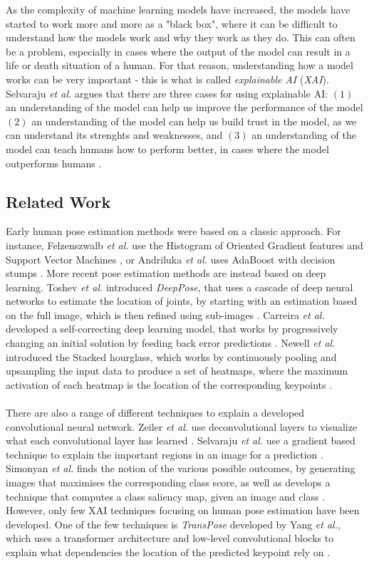 \documentclass[./main.tex]{subfiles}
\begin{document}
As the complexity of machine learning models have increased, the models have started to work more and more as a "black box", where it can be difficult to understand how the models work and why they work as they do. This can often be a problem, especially in cases where the output of the model can result in a life or death situation of a human. For that reason, understanding how a model works can be very important - this is what is called \textit{explainable AI} (\textit{XAI}). Selvaraju \textit{et al.} \cite{Selvaraju} argues that there are three cases for using explainable AI: $(1)$ an understanding of the model can help us improve the performance of the model $(2)$ an understanding of the model can help us build trust in the model, as we can understand its strenghts and weaknesses, and $(3)$ an understanding of the model can teach humans how to perform better, in cases where the model outperforms humans \cite{Selvaraju}.

\subsection{Related Work}
Early human pose estimation methods were based on a classic approach. For instance, Felzenszwalb \textit{et al.} use the Histogram of Oriented Gradient features and Support Vector Machines \cite{Felzenszwalb}, or Andriluka \textit{et al.} uses AdaBoost with decision stumps \cite{Andriluka}. More recent pose estimation methods are instead based on deep learning. Toshev \textit{et al.} introduced \textit{DeepPose}, that uses a cascade of deep neural networks to estimate the location of joints, by starting with an estimation based on the full image, which is then refined using sub-images \cite{DeepPose}. Carreira \textit{et al.} developed a self-correcting deep learning model, that works by progressively changing an initial solution by feeding back error predictions \cite{Carreira}. Newell \textit{et al.} introduced the Stacked hourglass, which works by continuously pooling and upsampling the input data to produce a set of heatmaps, where the maximum activation of each heatmap is the location of the corresponding keypoints \cite{Newell}.
\\
\\
There are also a range of different techniques to explain a developed convolutional neural network. Zeiler \textit{et al.} use deconvolutional layers to visualize what each convolutional layer has learned \cite{Zeiler}. Selvaraju \textit{et al.} use a gradient based technique to explain the important regions in an image for a prediction \cite{Selvaraju}. Simonyan \textit{et al.} finds the notion of the various possible outcomes, by generating images that maximises the corresponding class score, as well as develops a technique that computes a class saliency map, given an image and class \cite{Simonyan}. However, only few XAI techniques focusing on human pose estimation have been developed. One of the few techniques is \textit{TransPose} developed by Yang \textit{et al.}, which uses a transformer architecture and low-level convolutional blocks to explain what dependencies the location of the predicted keypoint rely on \cite{TransPose}.
\end{document}
